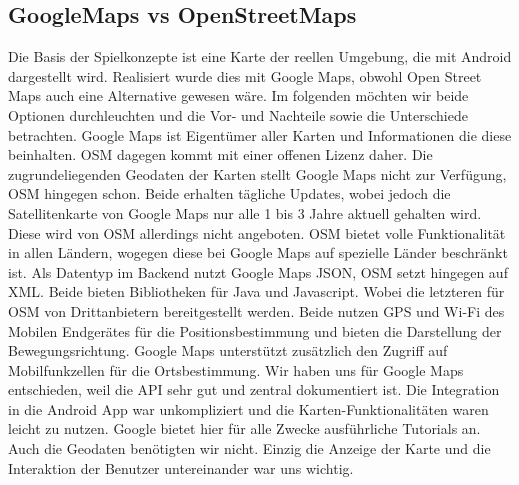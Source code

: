 \subsection{GoogleMaps vs OpenStreetMaps}
Die Basis der Spielkonzepte ist eine Karte der reellen Umgebung, die mit Android dargestellt wird. Realisiert wurde dies mit Google Maps, obwohl Open Street Maps auch eine Alternative gewesen wäre. Im folgenden möchten wir beide Optionen durchleuchten und die Vor- und Nachteile sowie die Unterschiede betrachten. 
Google Maps ist Eigentümer aller Karten und Informationen die diese beinhalten. OSM dagegen kommt mit einer offenen Lizenz daher. Die zugrundeliegenden Geodaten der Karten stellt Google Maps nicht zur Verfügung, OSM hingegen schon. Beide erhalten tägliche Updates, wobei jedoch die Satellitenkarte von Google Maps nur alle 1 bis 3 Jahre aktuell gehalten wird. Diese wird von OSM allerdings nicht angeboten.
OSM bietet volle Funktionalität in allen Ländern, wogegen diese bei Google Maps auf spezielle Länder beschränkt ist. 
Als Datentyp im Backend nutzt Google Maps JSON, OSM setzt hingegen auf XML. Beide bieten Bibliotheken für Java und Javascript. Wobei die letzteren für OSM von Drittanbietern bereitgestellt werden. 
Beide nutzen GPS und Wi-Fi des Mobilen Endgerätes für die Positionsbestimmung und bieten die Darstellung der Bewegungsrichtung. Google Maps unterstützt zusätzlich den Zugriff auf Mobilfunkzellen für die Ortsbestimmung.
Wir haben uns für Google Maps entschieden, weil die API sehr gut und zentral dokumentiert ist. Die Integration in die Android App war unkompliziert und die Karten-Funktionalitäten waren leicht zu nutzen. Google bietet hier für alle Zwecke ausführliche Tutorials an. Auch die Geodaten benötigten wir nicht. Einzig die Anzeige der Karte und die Interaktion der Benutzer untereinander war uns wichtig.
